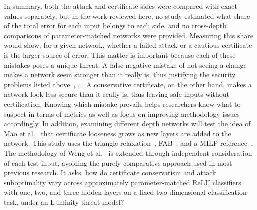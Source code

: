 In summary, both the attack and certificate sides were compared with exact values
separately, but in the work reviewed here, no study estimated what share of the total
error for each input belongs to each side, and no cross-depth comparisons of parameter-matched
networks were provided. Measuring this share would show, for a given network, whether a failed
attack or a cautious certificate is the larger source of error. This matter is important because
each of these mistakes poses a unique threat. A false negative mistake of not seeing a change makes
a network seem stronger than it really is, thus justifying the security problems listed
above~\cite{MapSource03}, \cite{MapSource06}, \cite{Tramer2020Adaptive}. A conservative certificate,
on the other hand, makes a network look less secure than it really is, thus leaving safe inputs
without certification. Knowing which mistake prevails helps researchers know what to suspect in
terms of metrics as well as focus on improving methodology issues accordingly. In addition,
examining different depth networks will test the idea of Mao et al.~\cite{MapSource21} that
certificate looseness grows as new layers are added to the network. This study uses the triangle
relaxation~\cite{MapSource09}, FAB~\cite{MapSource05}, and a MILP reference~\cite{MapSource12}. The
methodology of Weng et al.~\cite{Weng2018FastLin} is extended through independent consideration of
each test input, avoiding the purely comparative approach used in most previous research. It asks:
how do certificate conservatism and attack suboptimality vary across approximately parameter-matched
ReLU classifiers with one, two, and three hidden layers on a fixed two-dimensional classification
task, under an L-infinity threat model?